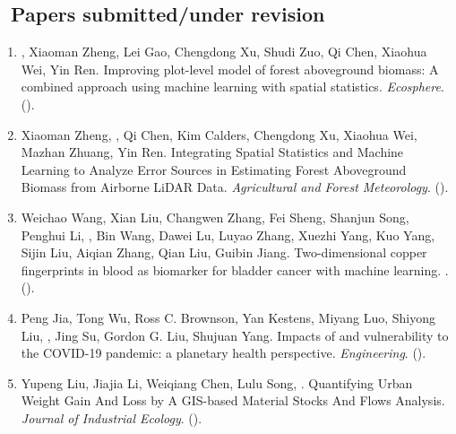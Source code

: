 \subsection*{\texorpdfstring{\faBook\ Papers submitted/under revision}{Papers submitted/under revision}}
\begin{enumerate}
\item
    \Shaoqing\CF, Xiaoman Zheng\CF, Lei Gao, Chengdong Xu, Shudi Zuo, Qi Chen, Xiaohua Wei, Yin Ren.
    Improving plot-level model of forest aboveground biomass: A combined approach using machine learning with spatial statistics.
    \textit{Ecosphere}. 
    (\Review).
\item
    Xiaoman Zheng, \Shaoqing, Qi Chen, Kim Calders, Chengdong Xu, Xiaohua Wei, Mazhan Zhuang, Yin Ren.
    Integrating Spatial Statistics and Machine Learning to Analyze Error Sources in Estimating Forest Aboveground Biomass from Airborne LiDAR Data.
    \textit{Agricultural and Forest Meteorology}. 
    (\Revision).
\item
    Weichao Wang, Xian Liu, Changwen Zhang, Fei Sheng, Shanjun Song, Penghui Li, \Shaoqing, Bin Wang, Dawei Lu, Luyao Zhang, Xuezhi Yang, Kuo Yang, Sijin Liu, Aiqian Zhang, Qian Liu, Guibin Jiang.
    Two-dimensional copper fingerprints in blood as biomarker for bladder cancer with machine learning.
    \textit{}. 
    (\Submitted).
\item
    Peng Jia, Tong Wu, Ross C. Brownson, Yan Kestens, Miyang Luo, Shiyong Liu, \Shaoqing, Jing Su, Gordon G. Liu, Shujuan Yang.
    Impacts of and vulnerability to the COVID-19 pandemic: a planetary health perspective.
    \textit{Engineering}. 
    (\Review).
\item
    Yupeng Liu, Jiajia Li, Weiqiang Chen, Lulu Song, \Shaoqing.
    Quantifying Urban Weight Gain And Loss by A GIS-based Material Stocks And Flows Analysis.
    \textit{Journal of Industrial Ecology}. 
    (\Review).
\end{enumerate}